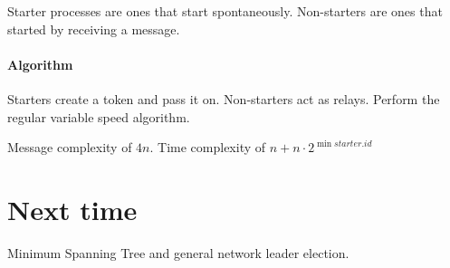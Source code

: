 \documentclass{idc_msc}
\begin{document}
Starter processes are ones that start spontaneously.
Non-starters are ones that started by receiving a message.

\paragraph{Algorithm}
Starters create a token and pass it on.
Non-starters act as relays.
Perform the regular variable speed algorithm.

Message complexity of $4n$.
Time complexity of $n + n\cdot 2^{\min starter.id}$

\section{Next time}
Minimum Spanning Tree and general network leader election.
\end{document}

